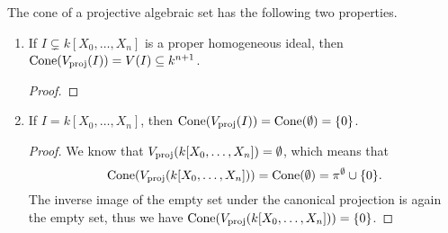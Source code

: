 The cone of a projective algebraic set has the following two properties. \begin{enumerate}
    \item If $I\subsetneq k[X_0, \ldots, X_n]$ is a proper homogeneous ideal, then $\operatorname{Cone}(V_{\text{proj}}(I)) = V(I)\subseteq k^{n+1}$. 
    \begin{proof}
    
    \end{proof}
    
    \item If $I=k[X_0, \ldots, X_n]$, then $\operatorname{Cone}(V_{\text{proj}}(I))=\operatorname{Cone}(\emptyset)=\{0\}$. 
    \begin{proof}
    We know that $V_{\text{proj}}(k[X_0, \ldots, X_n]) = \emptyset$, which means that
    \begin{equation*}
        \operatorname{Cone}(V_{\text{proj}}(k[X_0, \ldots, X_n]))=\operatorname{Cone}(\emptyset)=\pi^{\emptyset}\cup \{0\}.
    \end{equation*}
    The inverse image of the empty set under the canonical projection is again the empty set, thus we have $\operatorname{Cone}(V_{\text{proj}}(k[X_0, \ldots, X_n]))=\{0\}$. 
    \end{proof}
\end{enumerate}

